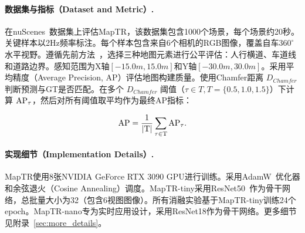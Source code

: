 \documentclass{article} %
\begin{document}
\paragraph{数据集与指标（Dataset and Metric）.}
在nuScenes~\citep{nuscenes}数据集上评估MapTR，该数据集包含1000个场景，每个场景约20秒。关键样本以2Hz频率标注。每个样本包含来自6个相机的RGB图像，覆盖自车$360^\circ$水平视野。遵循先前方法~\citep{hdmapnet,vectormapnet}，选择三种地图元素进行公平评估：人行横道、车道线和道路边界。感知范围为X轴$[-15.0m, 15.0m]$和Y轴$[-30.0m, 30.0m]$。采用平均精度（Average Precision, AP）评估地图构建质量。使用Chamfer距离 $D_{Chamfer}$ 判断预测与GT是否匹配。在多个 $D_{Chamfer}$ 阈值（$\tau \in T, T=\{0.5, 1.0, 1.5\}$）下计算 $\rm{AP}_{\tau}$，然后对所有阈值取平均作为最终AP指标：

\begin{equation}
\rm{AP} = \frac{1}{|T|} \sum_{\tau \in T} \rm{AP}_{\tau}.
\end{equation}



\paragraph{实现细节（Implementation Details）.}
MapTR使用8张NVIDIA GeForce RTX 3090 GPU进行训练。采用AdamW~\citep{adamw}优化器和余弦退火（Cosine Annealing）调度。MapTR-tiny采用ResNet50~\citep{resnet}作为骨干网络，总批量大小为32（包含6视图图像）。所有消融实验基于MapTR-tiny训练24个epoch。MapTR-nano专为实时应用设计，采用ResNet18作为骨干网络。更多细节见附录~\ref{sec:more_details}。

\end{document}
